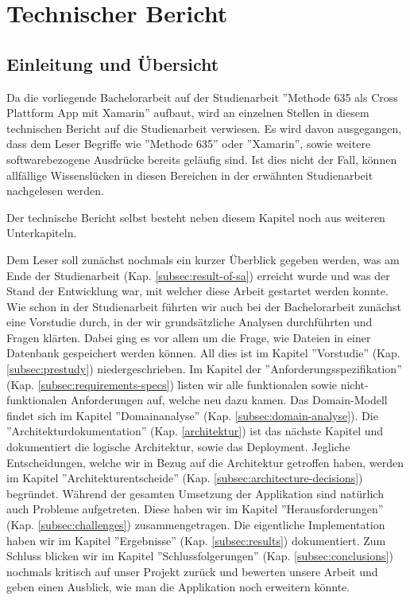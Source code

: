 \section{Technischer Bericht}

\subsection{Einleitung und Übersicht}
Da die vorliegende Bachelorarbeit auf der Studienarbeit ''Methode 635 als Cross Plattform App mit Xamarin'' \cite{methode635-sa} aufbaut, wird an einzelnen Stellen in diesem technischen Bericht auf die Studienarbeit verwiesen. Es wird davon ausgegangen, dass dem Leser Begriffe wie ''Methode 635'' oder ''Xamarin'', sowie weitere softwarebezogene Ausdrücke bereits geläufig sind. Ist dies nicht der Fall, können allfällige Wissenslücken in diesen Bereichen in der erwähnten Studienarbeit nachgelesen werden.

Der technische Bericht selbst besteht neben diesem Kapitel noch aus weiteren Unterkapiteln. 

Dem Leser soll zunächst nochmals ein kurzer Überblick gegeben werden, was am Ende der Studienarbeit (Kap. \ref{subsec:result-of-sa}) erreicht wurde und was der Stand der Entwicklung war, mit welcher diese Arbeit gestartet werden konnte. Wie schon in der Studienarbeit führten wir auch bei der Bachelorarbeit zunächst eine Vorstudie durch, in der wir grundsätzliche Analysen durchführten und Fragen klärten. Dabei ging es vor allem um die Frage, wie Dateien in einer Datenbank gespeichert werden können. All dies ist im Kapitel ''Vorstudie'' (Kap. \ref{subsec:prestudy}) niedergeschrieben. Im Kapitel der ''Anforderungsspezifikation'' (Kap. \ref{subsec:requirements-specs}) listen wir alle funktionalen sowie nicht-funktionalen Anforderungen auf, welche neu dazu kamen. Das Domain-Modell findet sich im Kapitel ''Domainanalyse'' (Kap. \ref{subsec:domain-analyse}). Die ''Architektur\-dokumentation'' (Kap. \ref{architektur}) ist das nächste Kapitel und dokumentiert die logische Architektur, sowie das Deployment. Jegliche Entscheidungen, welche wir in Bezug auf die Architektur getroffen haben, werden im Kapitel ''Architekturentscheide'' (Kap. \ref{subsec:architecture-decisions}) begründet. Während der gesamten Umsetzung der Applikation sind natürlich auch Probleme aufgetreten. Diese haben wir im Kapitel ''Herausforderungen'' (Kap. \ref{subsec:challenges}) zusammengetragen. Die eigentliche Implementation haben wir im Kapitel ''Ergebnisse'' (Kap. \ref{subsec:results}) dokumentiert. Zum Schluss blicken wir im Kapitel ''Schlussfolgerungen'' (Kap. \ref{subsec:conclusions}) nochmals kritisch auf unser Projekt zurück und bewerten unsere Arbeit und geben einen Ausblick, wie man die Applikation noch erweitern könnte.

